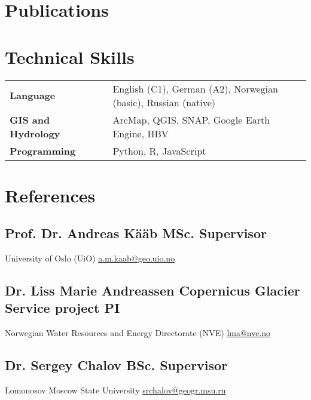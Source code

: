 \documentclass[a4,10pt]{article}
\newcommand{\hskills}[1]{
\textbf{\bfseries #1} }
\begin{document}
\section{Publications} 
\renewcommand\refname{\vskip -1.5em}
\nocite{*}
\printbibliography[heading=none]
\vspace{-0.4cm}


\section{Technical Skills}
\begin{tabular}{p{11em} p{1em} p{43em}}
\hskills{Language} &  &  English (C1), German (A2), Norwegian (basic), Russian (native) \\
\hskills{GIS and Hydrology} &  & ArcMap, QGIS, SNAP, Google Earth Engine, HBV  \\
\hskills{Programming} &  & Python, R, JavaScript \\
\end{tabular}
\vspace{-0.2cm}




\section{References} 

\subsection*{Prof. Dr. Andreas Kääb  \hfill MSc. Supervisor} 
University of Oslo (UiO) \hfill \href{a.m.kaab@geo.uio.no}{a.m.kaab@geo.uio.no} 
\vspace{0.1cm}

\subsection*{Dr. Liss Marie Andreassen \hfill Copernicus Glacier Service project PI}
Norwegian Water Resources and Energy Directorate (NVE) \hfill \href{lma@nve.no}{lma@nve.no}

\vspace{0.1cm}
\subsection*{Dr. Sergey Chalov \hfill BSc. Supervisor}
Lomonosov Moscow State University \hfill \href{srchalov@geogr.msu.ru}{srchalov@geogr.msu.ru}


\end{document}
